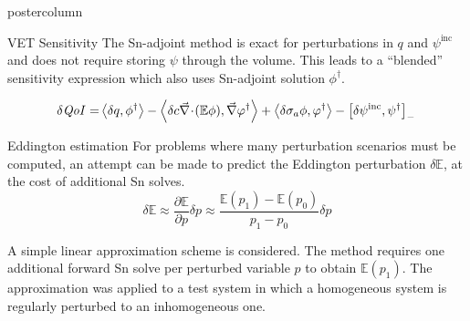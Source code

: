 \documentclass[xcolor={usenames,dvipsnames,svgnames,table}]{beamer}
\newcommand{\bra}{\left\langle}
\newcommand{\ket}{\right\rangle}
\newcommand{\sbra}{\left[}
\newcommand{\sket}{\right]}
\newcommand{\Edd}{\mathbb{E}}
\newcommand{\isigt}{c}
\newcommand{\qoi}{{\it QoI}\xspace}
\begin{document}
\begin{frame}
\begin{columns}
\begin{column}{.33\textwidth}
\begin{beamercolorbox}[center,wd=\textwidth]{postercolumn}
\begin{minipage}[T]{0.95\textwidth}
{\begin{block}{VET Sensitivity}
The Sn-adjoint method is exact for perturbations in $q$ and $\psi^\text{inc}$ and does not require storing $\psi$ through the volume. This leads to a ``blended'' sensitivity expression which also uses Sn-adjoint solution $\phi^\dag$.

\begin{equation}
\label{SensIP2}
\begin{split}
\delta \qoi =&  \bra \delta q , \phi^\dag \ket - \bra \delta \isigt \div (\Edd \phi), \grad \varphi^\dag \ket + \bra \delta \sigma_a \phi, \varphi^\dag \ket \\
\end{split} - \sbra \delta \psi^{\text{inc}}, \psi^\dag \sket_- \,
\end{equation}


			    \end{block}
			    \vfill
			    \begin{block}{Eddington estimation}
			    For problems where many perturbation scenarios must be computed, an attempt can be made to predict the Eddington perturbation $\delta \Edd$, at the cost of additional Sn solves. 
\begin{equation}
	\delta \Edd \approx \frac{\partial \Edd}{\partial p} \delta p \approx \frac{\Edd(p_1) - \Edd(p_0)}{p_1 - p_0} \delta p	     
\end{equation}

A simple linear approximation scheme is considered. The method requires one additional forward Sn solve per perturbed variable $p$ to obtain $\Edd(p_1)$.	
The approximation was applied to a test system in which a homogeneous system is regularly perturbed to an inhomogeneous one.


\end{block}}
\end{minipage}
\end{beamercolorbox}
\end{column}
\end{columns}
\end{frame}
\end{document}
